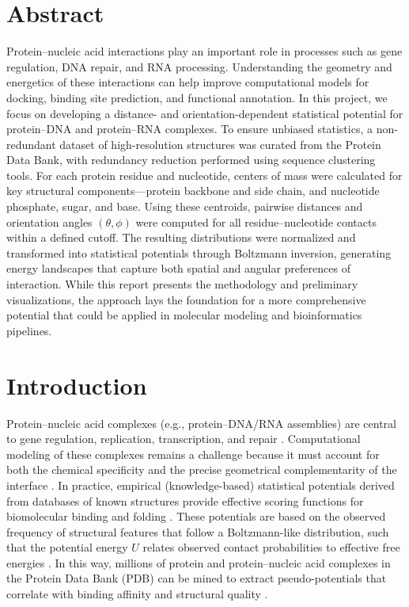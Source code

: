 \documentclass[12pt,a4paper]{report}
\begin{document}
\section*{Abstract}
Protein--nucleic acid interactions play an important role in processes such as gene regulation, 
DNA repair, and RNA processing. Understanding the geometry and energetics of these interactions can help improve computational models for docking, binding site prediction, and functional annotation. In this project, we focus on developing a distance- and orientation-dependent statistical potential for protein--DNA and protein--RNA complexes. To ensure unbiased statistics, a non-redundant dataset of high-resolution structures was curated from the Protein Data Bank, with redundancy reduction performed using sequence clustering tools. For each protein residue and nucleotide, centers of mass were calculated for key structural components---protein backbone and side chain, and nucleotide phosphate, sugar, and base. Using these centroids, pairwise distances and orientation angles $(\theta, \phi)$ were computed for all residue--nucleotide contacts within a defined cutoff. The resulting distributions were normalized and transformed into statistical potentials through Boltzmann inversion, generating energy landscapes that capture both spatial and angular preferences of interaction. While this report presents the methodology and preliminary visualizations, the approach lays the foundation for a more comprehensive potential that could be applied in molecular modeling and bioinformatics pipelines.


\section*{Introduction}

Protein--nucleic acid complexes (e.g., protein--DNA/RNA assemblies) are central to gene regulation, replication, transcription, and repair \cite{Zhu2020}. Computational modeling of these complexes remains a challenge because it must account for both the chemical specificity and the precise geometrical complementarity of the interface \cite{Yu2019}. In practice, empirical (knowledge-based) statistical potentials derived from databases of known structures provide effective scoring functions for biomolecular binding and folding \cite{Yu2019}. These potentials are based on the observed frequency of structural features that follow a Boltzmann-like distribution, such that the potential energy $U$ relates observed contact probabilities to effective free energies \cite{Yu2019}. In this way, millions of protein and protein--nucleic acid complexes in the Protein Data Bank (PDB) can be mined to extract pseudo-potentials that correlate with binding affinity and structural quality \cite{Yu2019}.
\end{document}
